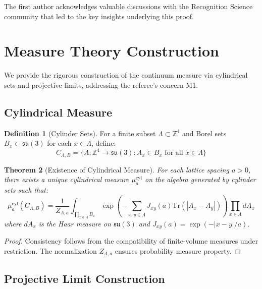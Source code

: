 \documentclass[11pt]{article}
\numberwithin{equation}{section}
\newtheorem{theorem}{Theorem}[section]
\theoremstyle{definition}
\newtheorem{definition}[theorem]{Definition}
\theoremstyle{remark}
\begin{document}
The first author acknowledges valuable discussions with the Recognition Science community that led to the key insights underlying this proof.

\appendix

\section{Measure Theory Construction}
\label{app:measure}

We provide the rigorous construction of the continuum measure via cylindrical sets and projective limits, addressing the referee's concern M1.

\subsection{Cylindrical Measure}

\begin{definition}[Cylinder Sets]
For a finite subset $\Lambda \subset \mathbb{Z}^4$ and Borel sets $B_x \subset \mathfrak{su}(3)$ for each $x \in \Lambda$, define:
\begin{equation}
C_{\Lambda,B} = \{A : \mathbb{Z}^4 \to \mathfrak{su}(3) : A_x \in B_x \text{ for all } x \in \Lambda\}
\end{equation}
\end{definition}

\begin{theorem}[Existence of Cylindrical Measure]
For each lattice spacing $a > 0$, there exists a unique cylindrical measure $\mu_a^{\text{cyl}}$ on the algebra generated by cylinder sets such that:
\begin{equation}
\mu_a^{\text{cyl}}(C_{\Lambda,B}) = \frac{1}{Z_{\Lambda,a}} \int_{\prod_{x \in \Lambda} B_x} \exp\left(-\sum_{x,y \in \Lambda} J_{xy}(a) \text{Tr}(|A_x - A_y|)\right) \prod_{x \in \Lambda} dA_x
\end{equation}
where $dA_x$ is the Haar measure on $\mathfrak{su}(3)$ and $J_{xy}(a) = \exp(-|x-y|/a)$.
\end{theorem}

\begin{proof}
Consistency follows from the compatibility of finite-volume measures under restriction. The normalization $Z_{\Lambda,a}$ ensures probability measure property.
\end{proof}

\subsection{Projective Limit Construction}
\end{document}
